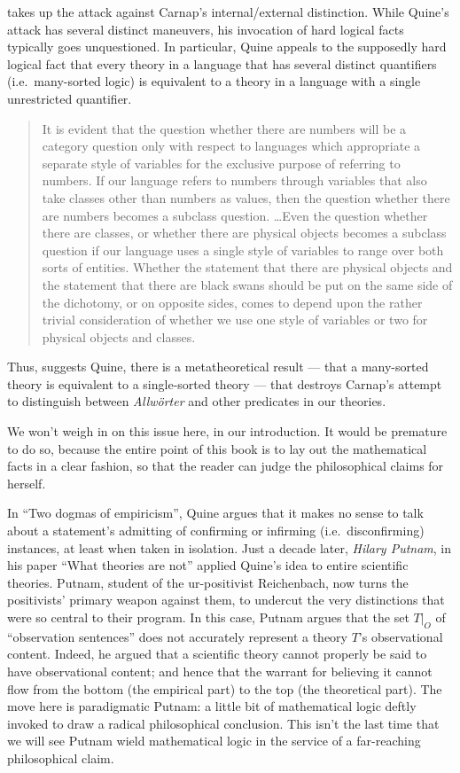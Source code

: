\cite{quine1951a,quine1960} takes up the attack against Carnap's
internal/external distinction.  While Quine's attack has several
distinct maneuvers, his invocation of hard logical facts typically
goes unquestioned.  In particular, Quine appeals to the supposedly
hard logical fact that every theory in a language that has several
distinct quantifiers (i.e.\ many-sorted logic) is equivalent to a
theory in a language with a single unrestricted
quantifier.  \begin{quote} It is evident that the question whether
  there are numbers will be a category question only with respect to
  languages which appropriate a separate style of variables for the
  exclusive purpose of referring to numbers.  If our language refers
  to numbers through variables that also take classes other than
  numbers as values, then the question whether there are numbers
  becomes a subclass question. \ldots Even the question whether there
  are classes, or whether there are physical objects becomes a
  subclass question if our language uses a single style of variables
  to range over both sorts of entities.  Whether the statement that
  there are physical objects and the statement that there are black
  swans should be put on the same side of the dichotomy, or on
  opposite sides, comes to depend upon the rather trivial
  consideration of whether we use one style of variables or two for
  physical objects and classes. \citep[p 208]{quine1976} \end{quote}
Thus, suggests Quine, there is a metatheoretical result --- that a
many-sorted theory is equivalent to a single-sorted theory --- that
destroys Carnap's attempt to distinguish between {\it Allw\"orter} and
other predicates in our theories.

We won't weigh in on this issue here, in our introduction.  It would
be premature to do so, because the entire point of this book is to lay
out the mathematical facts in a clear fashion, so that the reader can
judge the philosophical claims for herself.

In ``Two dogmas of empiricism'', Quine argues that it makes no sense
to talk about a statement's admitting of confirming or infirming
(i.e.\ disconfirming) instances, at least when taken in isolation.
Just a decade later, \emph{Hilary Putnam}, in his paper ``What
theories are not'' \citep{putnam1962} applied Quine's idea to entire
scientific theories.  Putnam, student of the ur-positivist
Reichenbach, now turns the positivists' primary weapon against them,
to undercut the very distinctions that were so central to their
program.  In this case, Putnam argues that the set $T|_O$ of
``observation sentences'' does not accurately represent a theory $T$'s
observational content.  Indeed, he argued that a scientific theory
cannot properly be said to have observational content; and hence that
the warrant for believing it cannot flow from the bottom (the
empirical part) to the top (the theoretical part).  The move here is
paradigmatic Putnam: a little bit of mathematical logic deftly invoked
to draw a radical philosophical conclusion.  This isn't the last time
that we will see Putnam wield mathematical logic in the service of a
far-reaching philosophical claim.


